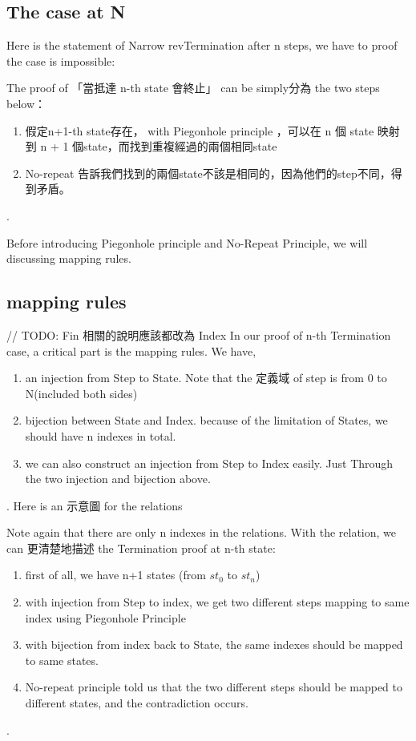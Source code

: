 \subsection{ The case at N }
Here is the statement of Narrow revTermination after n steps, we have to proof the case is impossible:


The proof of 「當抵達 n-th state 會終止」 can be simply分為 the two steps below：
\begin{enumerate}[1.]
    \item 假定n+1-th state存在， with Piegonhole principle ，可以在 n 個 state 映射到 n + 1 個state，而找到重複經過的兩個相同state
    \item No-repeat 告訴我們找到的兩個state不該是相同的，因為他們的step不同，得到矛盾。
\end{enumerate}.

Before introducing Piegonhole principle and No-Repeat Principle, we will discussing mapping rules.

\subsection{ mapping rules }
// TODO: Fin 相關的說明應該都改為 Index
In our proof of n-th Termination case, a critical part is the mapping rules.
We have,
\begin{enumerate}[1.]
    \item an injection from Step to State.  Note that the 定義域 of step is from 0 to N(included both sides)
    \item bijection between State and Index. because of the limitation of States, we should have n indexes in total.
    \item we can also construct an injection from Step to Index easily.  Just Through the two injection and bijection above.
\end{enumerate}.
Here is an 示意圖 for the relations


Note again that there are only n indexes in the relations.
With the relation, we can 更清楚地描述 the Termination proof at n-th state:
\begin{enumerate}[1.]
    \item first of all, we have n+1 states (from $st_{0}$ to $st_{n}$)
    \item with injection from Step to index, we get two different steps mapping to same index using Piegonhole Principle
    \item with bijection from index back to State, the same indexes should be mapped to same states.
    \item No-repeat principle told us that the two different steps should be mapped to different states, and the contradiction occurs.
\end{enumerate}.

